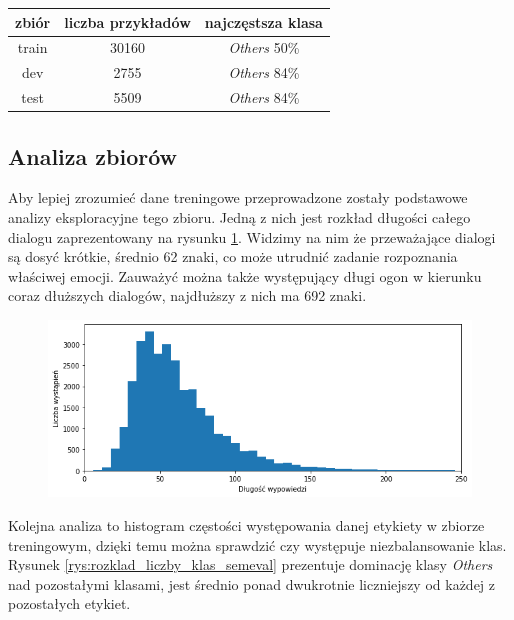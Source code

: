 \begin{table}[ht]
\label{tab:tabela_emocontext}
\centering\footnotesize%
\begin{tabular}{c c c}
\toprule
zbiór & liczba przykładów & najczęstsza klasa \\
\midrule
train   & 30160 & \textit{Others} 50\% \\
dev   & 2755 & \textit{Others} 84\% \\
test   & 5509 & \textit{Others} 84\% \\
\bottomrule
\end{tabular}
\end{table}

\subsection{Analiza zbiorów}

Aby lepiej zrozumieć dane treningowe przeprowadzone zostały podstawowe analizy eksploracyjne tego zbioru. Jedną z nich jest rozkład długości całego dialogu zaprezentowany na rysunku \ref{rys:rozklad_dl_semeval}. Widzimy na nim że przeważające dialogi są dosyć krótkie, średnio 62 znaki, co może utrudnić zadanie rozpoznania właściwej emocji. Zauważyć można także występujący długi ogon w kierunku coraz dłuższych dialogów, najdłuższy z nich ma 692 znaki.

\begin{figure}[t]
\centering\includegraphics[width=12cm]{figures/rozklad_dl_semeval.png}
\label{rys:rozklad_dl_semeval}
\end{figure}

Kolejna analiza to histogram częstości występowania danej etykiety w zbiorze treningowym, dzięki temu można sprawdzić czy występuje niezbalansowanie klas. Rysunek \ref{rys:rozklad_liczby_klas_semeval} prezentuje dominację klasy \textit{Others} nad pozostałymi klasami, jest średnio ponad dwukrotnie liczniejszy od każdej z pozostałych etykiet. 

